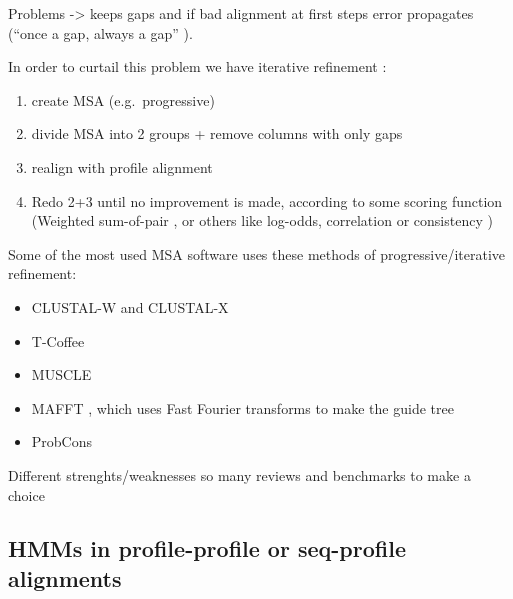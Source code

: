\documentclass[
  11pt,
  twoside]{scrbook}
\providecommand{\tightlist}{%
  \setlength{\itemsep}{0pt}\setlength{\parskip}{0pt}}
\begin{document}
Problems -\textgreater{} keeps gaps and if bad alignment at first steps error propagates (``once a gap, always a gap'' \autocite{fengProgressiveSequenceAlignment1987}).

In order to curtail this problem we have iterative refinement \autocite{russellMultipleSequenceAlignment2014}:

\begin{enumerate}
\def\labelenumi{\arabic{enumi}.}
\tightlist
\item
  create MSA (e.g.~progressive)
\item
  divide MSA into 2 groups + remove columns with only gaps
\item
  realign with profile alignment
\item
  Redo 2+3 until no improvement is made, according to some scoring function (Weighted sum-of-pair \autocite{altschulWeightsDataRelated1989}, or others like log-odds, correlation \autocite{edgarComparisonScoringFunctions2004} or consistency \autocite{notredameCOFFEEObjectiveFunction1998})
\end{enumerate}

Some of the most used MSA software uses these methods of progressive/iterative refinement:

\begin{itemize}
\item
  CLUSTAL-W \autocite{thompsonCLUSTALImprovingSensitivity1994} and CLUSTAL-X \autocite{thompsonCLUSTALWindowsInterface1997}
\item
  T-Coffee \autocite{notredameTcoffeeNovelMethod2000}
\item
  MUSCLE \autocite{edgarMUSCLEMultipleSequence2004a,edgarMUSCLEMultipleSequence2004}
\item
  MAFFT \autocite{katohMAFFTNovelMethod2002}, which uses Fast Fourier transforms to make the guide tree
\item
  ProbCons \autocite{doProbConsProbabilisticConsistencybased2005}
\end{itemize}

Different strenghts/weaknesses so many reviews and benchmarks to make a choice \autocite{notredameRecentEvolutionsMultiple2007,notredameRecentProgressMultiple2002,edgarMultipleSequenceAlignment2006,paisAssessingEfficiencyMultiple2014,thompsonBAliBASEBenchmarkAlignment1999}

\hypertarget{hmms-in-profile-profile-or-seq-profile-alignments}{%
\subsection{HMMs in profile-profile or seq-profile alignments}\label{hmms-in-profile-profile-or-seq-profile-alignments}}
\end{document}
